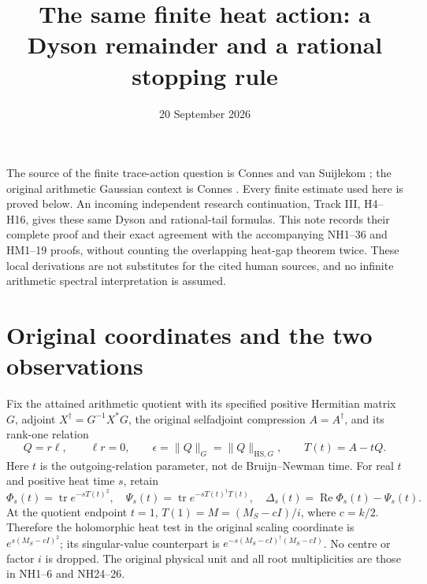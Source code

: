 \documentclass[11pt]{article}
\title{The same finite heat action: a Dyson remainder and a rational stopping rule}
\author{}\date{20 September 2026}
\newcommand{\tr}{\operatorname{tr}}
\newcommand{\Rea}{\operatorname{Re}}
\begin{document}
\maketitle

The source of the finite trace-action question is Connes and van
Suijlekom \cite[Section on the spectral action]{CV}; the original
arithmetic Gaussian context is Connes \cite[Gaussian equation ft]{CH}.
Every finite estimate used here is proved below. An incoming independent
research continuation, Track III, H4--H16, gives these same Dyson and
rational-tail formulas. This note records their complete proof and their
exact agreement with the accompanying NH1--36 and HM1--19 proofs,
without counting the overlapping heat-gap theorem twice.
These local derivations are not substitutes for the cited human sources,
and no infinite arithmetic spectral interpretation is assumed.

\section{Original coordinates and the two observations}
Fix the attained arithmetic quotient with its specified positive
Hermitian matrix \(G\), adjoint \(X^\dagger=G^{-1}X^*G\), the original
selfadjoint compression \(A=A^\dagger\), and its rank-one relation
\[
 Q=r\ell,\qquad \ell r=0,\qquad
 \epsilon=\|Q\|_G=\|Q\|_{\mathrm{HS},G},\qquad T(t)=A-tQ .
 \tag{DS1}
\]
Here \(t\) is the outgoing-relation parameter, not de Bruijn--Newman
time. For real \(t\) and positive heat time \(s\), retain
\[
 \Phi_s(t)=\tr e^{-sT(t)^2},\quad
 \Psi_s(t)=\tr e^{-sT(t)^\dagger T(t)},\quad
 \Delta_s(t)=\Rea\Phi_s(t)-\Psi_s(t).
 \tag{DS2}
\]
At the quotient endpoint \(t=1\), \(T(1)=M=(M_S-cI)/i\), where
\(c=k/2\). Therefore the holomorphic heat test in the original scaling
coordinate is \(e^{s(M_S-cI)^2}\); its singular-value counterpart is
\(e^{-s(M_S-cI)^\dagger(M_S-cI)}\). No centre or factor \(i\) is dropped.
The original physical unit and all root multiplicities are those in
NH1--6 and NH24--26.
\end{document}
